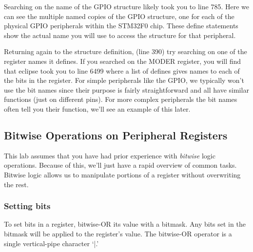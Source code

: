 \documentclass[11pt,fleqn]{book} %
\begin{document}
Searching on the name of the GPIO structure likely took you to line 785. Here we can see the multiple named copies of the GPIO structure, one for each of the physical GPIO peripherals within the STM32F0 chip. These define statements show the actual name you will use to access the structure for that peripheral.

Returning again to the structure definition, (line 390) try searching on one of the register names it defines. If you searched on the MODER register, you will find that eclipse took you to line 6499 where a list of defines gives names to each of the bits in the register. For simple peripherals like the GPIO, we typically won't use the bit names since their purpose is fairly straightforward and all have similar functions (just on different pins). For more complex peripherals the bit names often tell you their function, we'll see an example of this later.

%
%    
%    
%    

%


\subsection{Bitwise Operations on Peripheral Registers}

This lab assumes that you have had prior experience with \textit{bitwise} logic operations. Because of this, we'll just have a rapid overview of common tasks. Bitwise logic allows us to manipulate portions of a register without overwriting the rest.

\subsubsection{Setting bits}
To set bits in a register, bitwise-OR its value with a bitmask. Any bits set in the bitmask will be applied to the register's value. The bitwise-OR operator is a single vertical-pipe character `|.'
\end{document}
